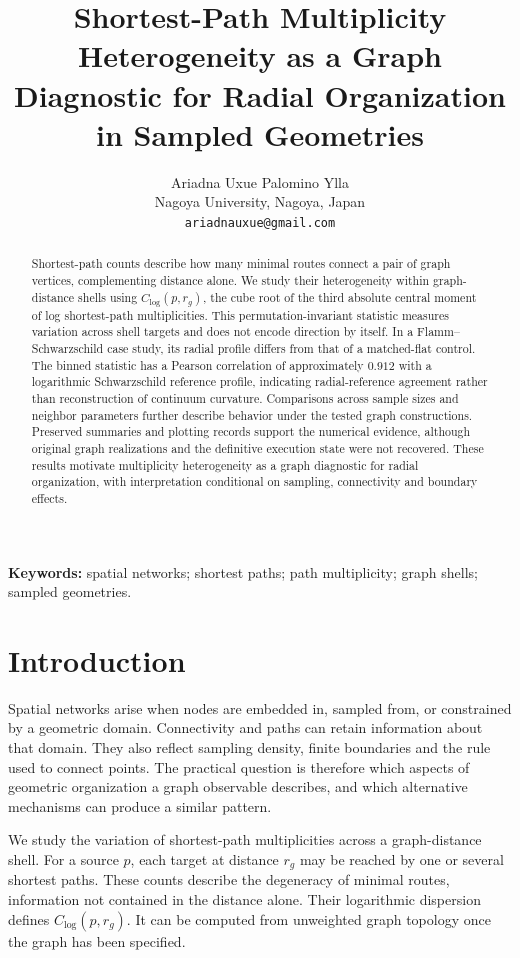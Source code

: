 \documentclass[11pt,a4paper]{article}
\title{Shortest-Path Multiplicity Heterogeneity as a Graph Diagnostic for Radial Organization in Sampled Geometries}
\author{Ariadna Uxue Palomino Ylla\\Nagoya University, Nagoya, Japan\\\texttt{ariadnauxue@gmail.com}}
\date{}
\begin{document}
\maketitle
\begin{abstract}
Shortest-path counts describe how many minimal routes connect a pair of graph vertices, complementing distance alone. We study their heterogeneity within graph-distance shells using $C_{\log}(p,r_g)$, the cube root of the third absolute central moment of log shortest-path multiplicities. This permutation-invariant statistic measures variation across shell targets and does not encode direction by itself. In a Flamm--Schwarzschild case study, its radial profile differs from that of a matched-flat control. The binned statistic has a Pearson correlation of approximately $0.912$ with a logarithmic Schwarzschild reference profile, indicating radial-reference agreement rather than reconstruction of continuum curvature. Comparisons across sample sizes and neighbor parameters further describe behavior under the tested graph constructions. Preserved summaries and plotting records support the numerical evidence, although original graph realizations and the definitive execution state were not recovered. These results motivate multiplicity heterogeneity as a graph diagnostic for radial organization, with interpretation conditional on sampling, connectivity and boundary effects.

\end{abstract}
\noindent\textbf{Keywords:} spatial networks; shortest paths; path multiplicity; graph shells; sampled geometries.

\section{Introduction}
Spatial networks arise when nodes are embedded in, sampled from, or constrained by a geometric domain. Connectivity and paths can retain information about that domain. They also reflect sampling density, finite boundaries and the rule used to connect points. The practical question is therefore which aspects of geometric organization a graph observable describes, and which alternative mechanisms can produce a similar pattern.

We study the variation of shortest-path multiplicities across a graph-distance shell. For a source $p$, each target at distance $r_g$ may be reached by one or several shortest paths. These counts describe the degeneracy of minimal routes, information not contained in the distance alone. Their logarithmic dispersion defines $C_{\log}(p,r_g)$. It can be computed from unweighted graph topology once the graph has been specified.
\end{document}
